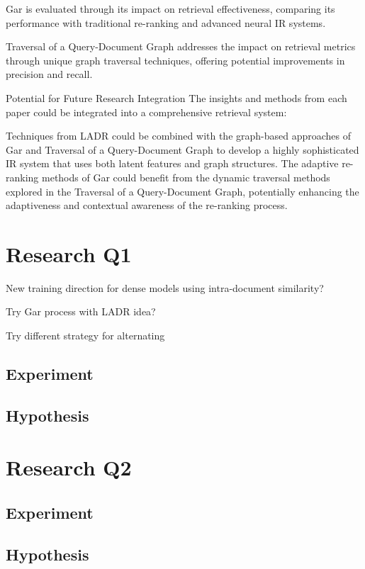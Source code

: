 \documentclass[sigconf,authorversion,nonacm]{acmart}
\begin{document}
Gar is evaluated through its impact on retrieval effectiveness, comparing its performance
with traditional re-ranking and advanced neural IR systems.

Traversal of a Query-Document Graph addresses the impact on retrieval metrics through unique
graph traversal techniques, offering potential improvements in precision and recall.

Potential for Future Research Integration The insights and methods from each paper could be
integrated into a comprehensive retrieval system:

Techniques from LADR could be combined with the graph-based approaches of Gar and Traversal
of a Query-Document Graph to develop a highly sophisticated IR system that uses both latent
features and graph structures. The adaptive re-ranking methods of Gar could benefit from the
dynamic traversal methods explored in the Traversal of a Query-Document Graph, potentially
enhancing the adaptiveness and contextual awareness of the re-ranking process.

\section{Research Q1}

New training direction for dense models using intra-document similarity?

Try Gar process with LADR idea?

Try different strategy for alternating
\subsection{Experiment}

\subsection{Hypothesis}

\section{Research Q2}

\subsection{Experiment}

\subsection{Hypothesis}
\end{document}
